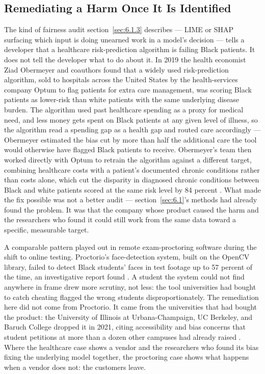 \subsection{Remediating a Harm Once It Is Identified}
\label{sec:10.3.2}
The kind of fairness audit section~\ref{sec:6.1.3} describes — LIME or SHAP surfacing which input is doing unearned work in a model's decision — tells a developer that a healthcare risk-prediction algorithm is failing Black patients. It does not tell the developer what to do about it. In 2019 the health economist Ziad Obermeyer and coauthors found that a widely used risk-prediction algorithm, sold to hospitals across the United States by the health-services company Optum to flag patients for extra care management, was scoring Black patients as lower-risk than white patients with the same underlying disease burden. The algorithm used past healthcare spending as a proxy for medical need, and less money gets spent on Black patients at any given level of illness, so the algorithm read a spending gap as a health gap and routed care accordingly — Obermeyer estimated the bias cut by more than half the additional care the tool would otherwise have flagged Black patients to receive. Obermeyer's team then worked directly with Optum to retrain the algorithm against a different target, combining healthcare costs with a patient's documented chronic conditions rather than costs alone, which cut the disparity in diagnosed chronic conditions between Black and white patients scored at the same risk level by 84 percent \autocite{obermeyer2019dissecting}. What made the fix possible was not a better audit — section~\ref{sec:6.1}'s methods had already found the problem. It was that the company whose product caused the harm and the researchers who found it could still work from the same data toward a specific, measurable target.

A comparable pattern played out in remote exam-proctoring software during the shift to online testing. Proctorio's face-detection system, built on the OpenCV library, failed to detect Black students' faces in test footage up to 57 percent of the time, an investigative report found \autocite{feathers2021proctorio}. A student the system could not find anywhere in frame drew more scrutiny, not less: the tool universities had bought to catch cheating flagged the wrong students disproportionately. The remediation here did not come from Proctorio. It came from the universities that had bought the product: the University of Illinois at Urbana-Champaign, UC Berkeley, and Baruch College dropped it in 2021, citing accessibility and bias concerns that student petitions at more than a dozen other campuses had already raised \autocite{flaherty2021illinois}. Where the healthcare case shows a vendor and the researchers who found its bias fixing the underlying model together, the proctoring case shows what happens when a vendor does not: the customers leave.


